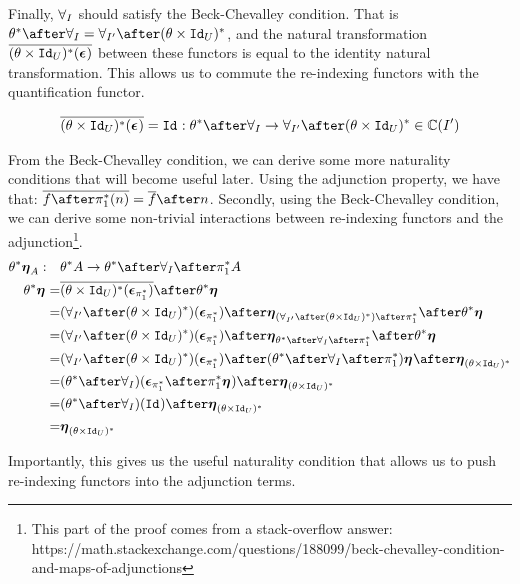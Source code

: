 \documentclass{Report}
\begin{document}
Finally, $\forall_I$ should satisfy the Beck-Chevalley condition. That is $\theta\star\after\allI = \allII\after(\theta\times\Id{U})\star$, and the natural transformation $\overline{(\theta\times\texttt{Id}_{U})^*(\boldsymbol{\epsilon}_{})}$ between these functors is equal to the identity natural transformation. This allows us to commute the re-indexing functors with the quantification functor.

\begin{align}
    \bar{(\theta\times\Id{U})\star(\counit{})} = \Id{}: \theta\star\after\allI \rightarrow \allII\after(\theta\times\Id{U})\star\in \C(I')
\end{align}

From the Beck-Chevalley condition, we can derive some more naturality conditions that will become useful later.
Using the adjunction property, we have that: $\bar{f\after\pstar(n)} = \bar{f}\after n$. Secondly, using the Beck-Chevalley condition, we can derive some non-trivial interactions between re-indexing functors and the adjunction\footnote{This part of the proof comes from a stack-overflow answer: https://math.stackexchange.com/questions/188099/beck-chevalley-condition-and-maps-of-adjunctions}. 
    \begin{align}
        \theta\star\unit{A}:\quad&\theta\star A \rightarrow \theta\star\after\allI\after\pstar A\\
        \theta\star\unit{} =& \bar{(\theta\times\Id{U})\star(\counit{\pstar})}\after\theta\star\unit{}\\
        =& (\allII\after(\theta\times\Id{U})\star)(\counit{\pstar})\after\unit{(\allII\after(\theta\times\Id{U})\star)\after\pstar}\after\theta\star\unit{}\\
        = & (\allII\after(\theta\times\Id{U})\star)(\counit{\pstar})\after\unit{\theta\star\after\allI\after\pstar}\after\theta\star\unit{}\\
        = & (\allII\after(\theta\times\Id{U})\star)(\counit{\pstar}) \after(\theta\star\after\allI\after\pstar)\unit{} \after\unit{(\theta\times\Id{U})\star}\\
        = & (\theta\star\after\allI)(\counit{\pstar}
        \after\pstar\unit{})\after\unit{(\theta\times\Id{U})\star}\\
        = & (\theta\star\after\allI)(\Id{})\after\unit{(\theta\times\Id{U})\star}\\
        = & \unit{(\theta\times\Id{U})\star}
    \end{align}

    Importantly, this gives us the useful naturality condition that allows us to push re-indexing functors into the adjunction terms.
\end{document}
